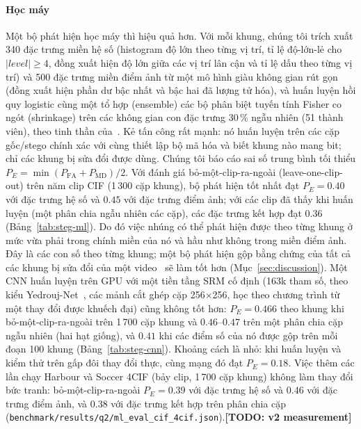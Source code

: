 \documentclass[journal]{IEEEtran}
\newcommand{\todo}[1]{\textbf{[TODO: #1]}}
\begin{document}
\paragraph{Học máy} Một bộ phát hiện học máy thì hiệu quả hơn. Với mỗi khung,
chúng tôi trích xuất 340 đặc trưng miền hệ số (histogram độ lớn theo từng vị
trí, tỉ lệ độ-lớn-lẻ cho $|\mathit{level}|\ge4$, đồng xuất hiện độ lớn giữa các
vị trí lân cận và tỉ lệ dấu theo từng vị trí) và 500 đặc trưng miền điểm ảnh từ
một mô hình giàu không gian rút gọn~\cite{ref:srm} (đồng xuất hiện phần dư bậc
nhất và bậc hai đã lượng tử hóa), và huấn luyện hồi quy logistic cùng một tổ hợp
(ensemble) các bộ phân biệt tuyến tính Fisher co ngót (shrinkage) trên các
không gian con đặc trưng 30\,\% ngẫu nhiên (51 thành viên), theo tinh thần
của~\cite{ref:ensemble}. Kẻ tấn công rất mạnh: nó huấn luyện trên các cặp
gốc/stego chính xác với cùng thiết lập bộ mã hóa và biết khung nào mang bit; chỉ
các khung bị sửa đổi được dùng. Chúng tôi báo cáo sai số trung bình tối thiểu
$P_E=\min(P_{\mathrm{FA}}+P_{\mathrm{MD}})/2$. Với đánh giá bỏ-một-clip-ra-ngoài
(leave-one-clip-out) trên năm clip CIF (1\,300 cặp khung), bộ phát hiện tốt nhất
đạt $P_E=0.40$ với đặc trưng hệ số và $0.45$ với đặc trưng điểm ảnh; với các clip
đã thấy khi huấn luyện (một phân chia ngẫu nhiên các cặp), các đặc trưng kết hợp
đạt $0.36$ (Bảng~\ref{tab:steg-ml}). Do đó việc nhúng có thể phát hiện được theo
từng khung ở mức vừa phải trong chính miền của nó và hầu như không trong miền
điểm ảnh. Đây là các con số theo từng khung; một bộ phát hiện gộp bằng chứng của
tất cả các khung bị sửa đổi của một video~\cite{ref:ker06} sẽ làm tốt hơn
(Mục~\ref{sec:discussion}). Một CNN huấn luyện trên GPU với một tiền tầng SRM cố
định (163k tham số, theo kiểu Yedrouj-Net~\cite{ref:yedroudj18}, các mảnh cắt
ghép cặp 256$\times$256, học theo chương trình từ một thay đổi được khuếch đại)
cũng không tốt hơn: $P_E=0.466$ theo khung khi bỏ-một-clip-ra-ngoài trên 1\,700
cặp khung và $0.46$--$0.47$ trên một phân chia cặp ngẫu nhiên (hai hạt giống),
và $0.41$ khi các điểm số của nó được gộp trên mỗi đoạn 100 khung
(Bảng~\ref{tab:steg-cnn}). Khoảng cách là nhỏ: khi huấn luyện và kiểm thử trên
gấp đôi thay đổi thực, cùng mạng đó đạt $P_E=0.18$. Việc thêm các lần chạy
Harbour và Soccer 4CIF (bảy clip, 1\,700 cặp khung) không làm thay đổi bức
tranh: bỏ-một-clip-ra-ngoài $P_E=0.39$ với đặc trưng hệ số và $0.46$ với đặc
trưng điểm ảnh, và $0.38$ với đặc trưng kết hợp trên phân chia cặp
(\texttt{benchmark/results/q2/ml\_eval\_cif\_4cif.json}).\todo{v2 measurement}
\end{document}
